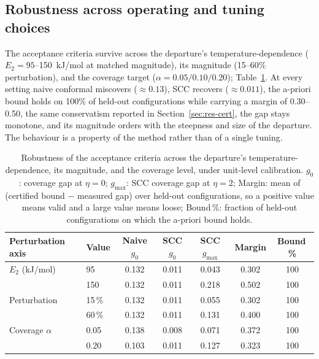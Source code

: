 \subsection{Robustness across operating and tuning choices}\label{sec:res-rob}
The acceptance criteria survive across the departure's temperature-dependence ($E_2=95$--150~kJ/mol
at matched magnitude), its magnitude (15--60\% perturbation), and the coverage target
($\alpha=0.05/0.10/0.20$); Table~\ref{tab:robust}. At every setting naive conformal miscovers
($\approx0.13$), SCC recovers ($\approx0.011$), the a-priori bound holds on 100\% of held-out
configurations while carrying a margin of 0.30--0.50, the same conservatism reported in
Section~\ref{sec:res-cert}, the gap stays monotone, and its magnitude orders with the steepness and
size of the departure. The behaviour is a property of the method rather than of a single tuning.

\begin{table}[t]\centering\footnotesize
\setlength{\tabcolsep}{9pt}\renewcommand{\arraystretch}{1.2}
\caption{Robustness of the acceptance criteria across the departure's temperature-dependence, its
magnitude, and the coverage level, under unit-level calibration. $g_0$: coverage gap at $\eta=0$;
$g_{\max}$: SCC coverage gap at $\eta=2$; Margin: mean of (certified bound $-$ measured gap) over
held-out configurations, so a positive value means valid and a large value means loose; Bound\,\%:
fraction of held-out configurations on which the a-priori bound holds.}\label{tab:robust}
\begin{tabular}{@{}llccccc@{}}\toprule
Perturbation axis & Value & Naive $g_0$ & SCC $g_0$ & SCC $g_{\max}$ & Margin & Bound\,\% \\\midrule
$E_2$ (kJ/mol) & 95   & 0.132 & 0.011 & 0.043 & 0.302 & 100 \\
               & 150  & 0.132 & 0.011 & 0.218 & 0.502 & 100 \\
Perturbation   & 15\,\% & 0.132 & 0.011 & 0.055 & 0.302 & 100 \\
               & 60\,\% & 0.132 & 0.011 & 0.131 & 0.400 & 100 \\
Coverage $\alpha$ & 0.05 & 0.138 & 0.008 & 0.071 & 0.372 & 100 \\
               & 0.20 & 0.103 & 0.011 & 0.127 & 0.323 & 100 \\\bottomrule
\end{tabular}
\end{table}

